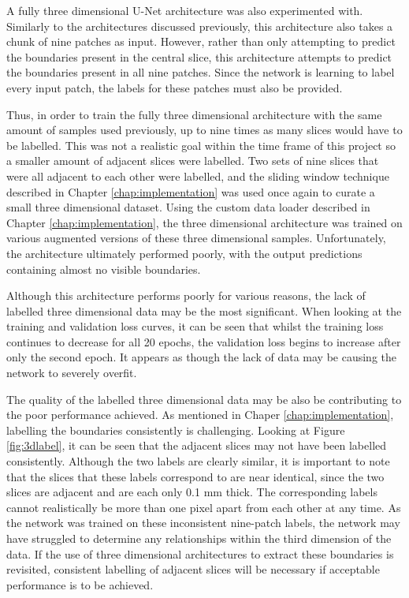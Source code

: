 A fully three dimensional U-Net architecture was also experimented with. Similarly to the architectures discussed previously, this architecture also takes a chunk of nine patches as input. However, rather than only attempting to predict the boundaries present in the central slice, this architecture attempts to predict the boundaries present in all nine patches. Since the network is learning to label every input patch, the labels for these patches must also be provided.

Thus, in order to train the fully three dimensional architecture with the same amount of samples used previously, up to nine times as many slices would have to be labelled. This was not a realistic goal within the time frame of this project so a smaller amount of adjacent slices were labelled. Two sets of nine slices that were all adjacent to each other were labelled, and the sliding window technique described in Chapter \ref{chap:implementation} was used once again to curate a small three dimensional dataset. Using the custom data loader described in Chapter \ref{chap:implementation}, the three dimensional architecture was trained on various augmented versions of these three dimensional samples. Unfortunately, the architecture ultimately performed poorly, with the output predictions containing almost no visible boundaries.

Although this architecture performs poorly for various reasons, the lack of labelled three dimensional data may be the most significant. When looking at the training and validation loss curves, it can be seen that whilst the training loss continues to decrease for all 20 epochs, the validation loss begins to increase after only the second epoch. It appears as though the lack of data may be causing the network to severely overfit.

The quality of the labelled three dimensional data may be also be contributing to the poor performance achieved. As mentioned in Chaper \ref{chap:implementation}, labelling the boundaries consistently is challenging. Looking at Figure \ref{fig:3dlabel}, it can be seen that the adjacent slices may not have been labelled consistently. Although the two labels are clearly similar, it is important to note that the slices that these labels correspond to are near identical, since the two slices are adjacent and are each only 0.1 mm thick. The corresponding labels cannot realistically be more than one pixel apart from each other at any time. As the network was trained on these inconsistent nine-patch labels, the network may have struggled to determine any relationships within the third dimension of the data. If the use of three dimensional architectures to extract these boundaries is revisited, consistent labelling of adjacent slices will be necessary if acceptable performance is to be achieved.

